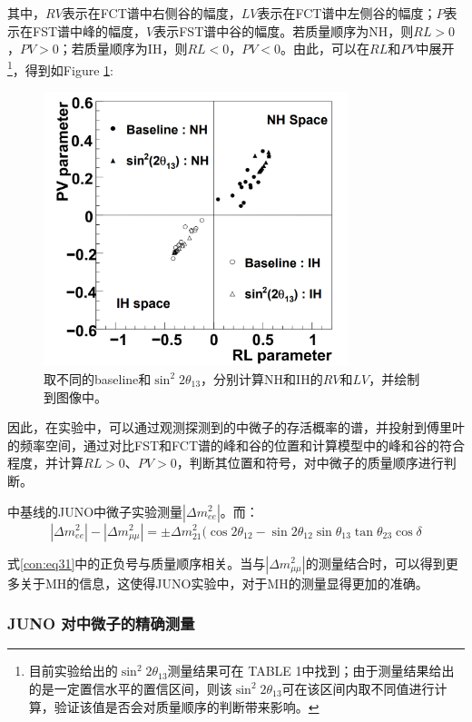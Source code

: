 \documentclass[10pt,a4paper]{article}
\begin{document}
其中，$RV$表示在FCT谱中右侧谷的幅度，$LV$表示在FCT谱中左侧谷的幅度；$P$表示在FST谱中峰的幅度，$V$表示FST谱中谷的幅度。若质量顺序为NH，则$RL>0$，$PV>0$；若质量顺序为IH，则$RL<0$，$PV<0$。由此，可以在$RL$和$PV$中展开\footnote{目前实验给出的$\sin^2 2\theta_{13}$测量结果可在\cite{Zhan:2008id} TABLE 1中找到；由于测量结果给出的是一定置信水平的置信区间，则该$\sin^2 2\theta_{13}$可在该区间内取不同值进行计算，验证该值是否会对质量顺序的判断带来影响。}，得到如Figure \ref{fig:33}:

\begin{figure}[H]
 \centering
 \includegraphics[height=8cm]{images/PVRL.png}
 \caption{取不同的baseline和$\sin^2 2\theta_{13}$，分别计算NH和IH的$RV$和$LV$，并绘制到图像中。}
 \label{fig:33}
\end{figure}


因此，在实验中，可以通过观测探测到的中微子的存活概率的谱，并投射到傅里叶的频率空间，通过对比FST和FCT谱的峰和谷的位置和计算模型中的峰和谷的符合程度，并计算$RL>0$、$PV>0$，判断其位置和符号，对中微子的质量顺序进行判断。


中基线的JUNO中微子实验测量$|\Delta{m_{ee}^2}|$。而：
\begin{equation}
\label{con:eq31}
|\Delta{m_{ee}^2}|-|\Delta {m^{2}_{\mu \mu}}|=\pm \Delta m_{21}^2(\cos2\theta_{12}-\sin2\theta_{12}\sin\theta_{13}\tan\theta_{23}\cos\delta
\end{equation}


式\eqref{con:eq31}中的正负号与质量顺序相关。当与$|\Delta{m_{\mu\mu}^2}|$的测量结合时，可以得到更多关于MH的信息，这使得JUNO实验中，对于MH的测量显得更加的准确\cite{2016Neutrino}。

\subsubsection{JUNO 对中微子的精确测量}\label{sub:1}
\end{document}
